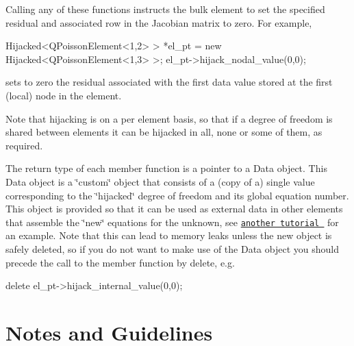 Calling any of these functions instructs the bulk element to set the specified residual and associated row in the Jacobian matrix to zero. For example, 
\begin{DoxyCode}
Hijacked<QPoissonElement<1,2> > *el\_pt = \textcolor{keyword}{new} Hijacked<QPoissonElement<1,3> >;
el\_pt->hijack\_nodal\_value(0,0);
\end{DoxyCode}
 sets to zero the residual associated with the first data value stored at the first (local) node in the element.

Note that hijacking is on a per element basis, so that if a degree of freedom is shared between elements it can be hijacked in all, none or some of them, as required.

The return type of each member function is a pointer to a {\ttfamily Data} object. This {\ttfamily Data} object is a \char`\"{}custom\char`\"{} object that consists of a (copy of a) single value corresponding to the \char`\"{}hijacked\char`\"{} degree of freedom and its global equation number. This object is provided so that it can be used as external data in other elements that assemble the \char`\"{}new\char`\"{} equations for the unknown, see \href{../../navier_stokes/static_single_layer/html/index.html}{\tt another tutorial } for an example. Note that this can lead to memory leaks unless the new object is safely deleted, so if you do not want to make use of the {\ttfamily Data} object you should precede the call to the member function by {\ttfamily delete}, e.\+g. 
\begin{DoxyCode}
\textcolor{keyword}{delete} el\_pt->hijack\_internal\_value(0,0);
\end{DoxyCode}




 

\hypertarget{index_notes}{}\section{Notes and Guidelines}\label{index_notes}

